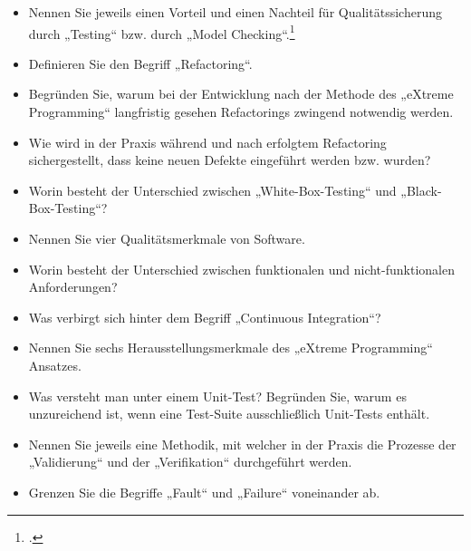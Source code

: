 \documentclass{lehramt-informatik}
\begin{document}
\begin{itemize}
\item Nennen Sie jeweils einen Vorteil und einen Nachteil für
Qualitätssicherung durch „Testing“ bzw. durch „Model Checking“.\footcite[Herbst 2013 (66116) - Thema 1, Teilaufgabe 2, Aufgabe 3]{examen:66116:2013:09}

\item Definieren Sie den Begriff „Refactoring“.

\item Begründen Sie, warum bei der Entwicklung nach der Methode des
„eXtreme Programming“ langfristig gesehen Refactorings zwingend notwendig
werden.

\item Wie wird in der Praxis während und nach erfolgtem Refactoring
sichergestellt, dass keine neuen Defekte eingeführt werden bzw. wurden?

\item Worin besteht der Unterschied zwischen „White-Box-Testing“ und
„Black-Box-Testing“?

\item Nennen Sie vier Qualitätsmerkmale von Software.

\item Worin besteht der Unterschied zwischen funktionalen und
nicht-funktionalen Anforderungen?

\item Was verbirgt sich hinter dem Begriff „Continuous Integration“?

\item Nennen Sie sechs Herausstellungsmerkmale des
„eXtreme Programming“ Ansatzes.

\item Was versteht man unter einem Unit-Test? Begründen Sie, warum es
unzureichend ist, wenn eine Test-Suite ausschließlich Unit-Tests
enthält.

\item Nennen Sie jeweils eine Methodik, mit welcher in der Praxis die
Prozesse der „Validierung“ und der „Verifikation“ durchgeführt werden.

\item Grenzen Sie die Begriffe „Fault“ und „Failure“ voneinander ab.

\end{itemize}

%
\end{document}
